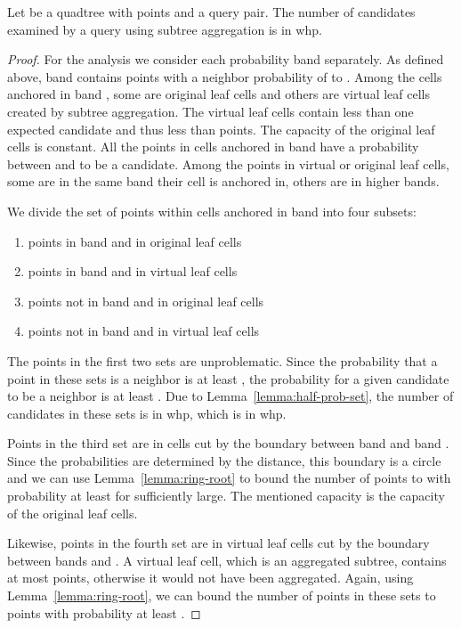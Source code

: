 \documentclass{llncs}
\begin{document}
\begin{lemma}
Let  be a quadtree with  points and  a query pair.
The number of candidates examined by a query using subtree aggregation is in  whp.
\label{lemma:subtree-aggregation-candidates}
\end{lemma}
\begin{proof}
For the analysis we consider each probability band  separately.
As defined above, band  contains points with a neighbor probability of  to .
Among the cells anchored in band , some are original leaf cells and others are virtual leaf cells created by subtree aggregation.
The virtual leaf cells contain less than one expected candidate and thus less than  points. The capacity of the original leaf cells is constant.
All the points in cells anchored in band  have a probability between  and  to be a candidate.
Among the points in virtual or original leaf cells, some are in the same band their cell is anchored in, others are in higher bands.

We divide the set of points within cells anchored in band  into four subsets:
\begin{enumerate}
 \item points in band  and in original leaf cells
 \item points in band  and in virtual leaf cells
 \item points not in band  and in original leaf cells
 \item points not in band  and in virtual leaf cells
\end{enumerate}

The points in the first two sets are unproblematic.
Since the probability that a point in these sets is a neighbor is at least , the probability for a given candidate to be a neighbor is at least .
Due to Lemma~\ref{lemma:half-prob-set}, the number of candidates in these sets is in  whp, which is in  whp.


Points in the third set are in cells cut by the boundary between band  and band .
Since the probabilities are determined by the distance, this boundary is a circle and we can use Lemma~\ref{lemma:ring-root} to bound the number of points to  with probability at least  for  sufficiently large.
The mentioned capacity is the capacity of the original leaf cells.

Likewise, points in the fourth set are in virtual leaf cells cut by the boundary between bands  and .
A virtual leaf cell, which is an aggregated subtree, contains at most  points, otherwise it would not have been aggregated.
Again, using Lemma~\ref{lemma:ring-root}, we can bound the number of points in these sets to  points with probability at least .


\end{proof}
\end{document}
